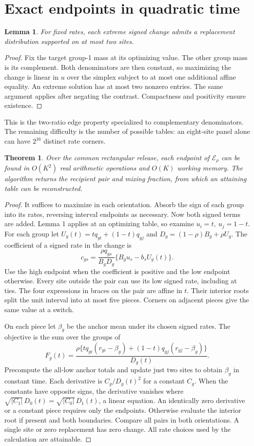 \documentclass[11pt]{article}
\newtheorem{theorem}{Theorem}
\newtheorem{lemma}{Lemma}
\newcommand{\E}{\mathcal{E}}
\begin{document}
\section{Exact endpoints in quadratic time}
\begin{lemma}
For fixed rates, each extreme signed change admits a replacement distribution supported on at most two sites.
\end{lemma}
\begin{proof}
Fix the target group-1 mass at its optimizing value. The other group mass is its complement. Both denominators are then constant, so maximizing the change is linear in $u$ over the simplex subject to at most one additional affine equality. An extreme solution has at most two nonzero entries. The same argument applies after negating the contrast. Compactness and positivity ensure existence.
\end{proof}
This is the two-ratio edge property specialized to complementary denominators. The remaining difficulty is the number of possible tables: an eight-site panel alone can have $2^{16}$ distinct rate corners.

\begin{theorem}
Over the common rectangular release, each endpoint of $\E_\rho$ can be found in $O(K^2)$ real arithmetic operations and $O(K)$ working memory. The algorithm returns the recipient pair and mixing fraction, from which an attaining table can be reconstructed.
\end{theorem}
\begin{proof}
It suffices to maximize in each orientation. Absorb the sign of each group into its rates, reversing interval endpoints as necessary. Now both signed terms are added. Lemma 1 applies at an optimizing table, so examine $u_i=t,\ u_j=1-t$. For each group let $U_g(t)=tq_{gi}+(1-t)q_{gj}$ and $D_g=(1-\rho)B_g+\rho U_g$. The coefficient of a signed rate in the change is
\[
 c_{gs}=\frac{\rho q_{gs}}{B_g D_g}\{B_g u_s-b_s U_g(t)\}.
\]
Use the high endpoint when the coefficient is positive and the low endpoint otherwise. Every site outside the pair can use its low signed rate, including at ties. The four expressions in braces on the pair are affine in $t$. Their interior roots split the unit interval into at most five pieces. Corners on adjacent pieces give the same value at a switch.

On each piece let $\beta_g$ be the anchor mean under its chosen signed rates. The objective is the sum over the groups of
\[
 F_g(t)=\frac{\rho\{t q_{gi}(r_{gi}-\beta_g)+(1-t)q_{gj}(r_{gj}-\beta_g)\}}{D_g(t)}.
\]
Precompute the all-low anchor totals and update just two sites to obtain $\beta_g$ in constant time. Each derivative is $C_g/D_g(t)^2$ for a constant $C_g$. When the constants have opposite signs, the derivative vanishes where
$\sqrt{|C_1|}\,D_0(t)=\sqrt{|C_0|}\,D_1(t)$, a linear equation. An identically zero derivative or a constant piece requires only the endpoints. Otherwise evaluate the interior root if present and both boundaries. Compare all pairs in both orientations. A single site or zero replacement has zero change. All rate choices used by the calculation are attainable.
\end{proof}
\end{document}
